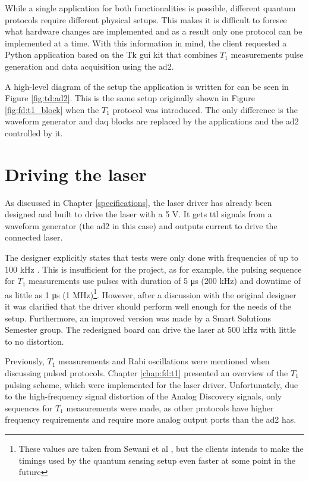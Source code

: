 While a single application for both functionalities is possible, different quantum protocols require different physical setups. This makes it is difficult to foresee what hardware changes are implemented and as a result only one protocol can be implemented at a time. With this information in mind, the client requested a Python application based on the Tk \gls{gui} kit that combines $T_1$ measurements pulse generation and data acquisition using the \gls{ad2}. 

A high-level diagram of the setup the application is written for can be seen in Figure \ref{fig:td:ad2}. This is the same setup originally shown in Figure \ref{fig:fd:t1_block} when the $T_1$ protocol was introduced. The only difference is the waveform generator and \gls{daq} blocks are replaced by the applications and the \gls{ad2} controlled by it.

\section{Driving the laser} \label{chap:fd:laser_driver}
As discussed in Chapter \ref{specifications}, the laser driver has already been designed and built to drive the laser with a 5 \unit[]{\volt}. It gets \gls{ttl} signals from a waveform generator (the \gls{ad2} in this case) and outputs current to drive the connected laser.

Тhe designer explicitly states that tests were only done with frequencies of up to 100 \unit{\kilo\hertz} \cite{sitnic2023}. This is insufficient for the project, as for example, the pulsing sequence for $T_1$ measurements use pulses with duration of 5 \unit{\micro\second} (200 \unit{\kilo\hertz}) and downtime of as little as 1 \unit{\micro\second} (1 \unit{\mega\hertz})\footnote{These values are taken from Sewani et al \cite{sewani2020coherent}, but the clients intends to make the timings used by the quantum sensing setup even faster at some point in the future}. However, after a discussion with the original designer it was clarified that the driver should perform well enough for the needs of the setup. Furthermore, an improved version was made by a Smart Solutions Semester group. The redesigned board can drive the laser at 500 \unit{\kilo\hertz} with little to no distortion.

Previously, $T_1$ measurements and Rabi oscillations were mentioned when discussing pulsed protocols. Chapter \ref{chap:fd:t1} presented an overview of the $T_1$ pulsing scheme, which were implemented for the laser driver. Unfortunately, due to the high-frequency signal distortion of the Analog Discovery signals, only sequences for $T_1$ measurements were made, as other protocols have higher frequency requirements and require more analog output ports than the \gls{ad2} has.

